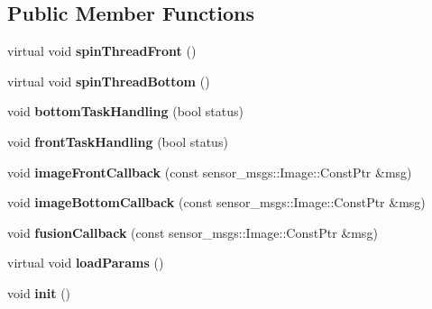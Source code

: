 \subsection*{Public Member Functions}
\begin{DoxyCompactItemize}
\item 
\mbox{\label{classBase__class_af6a0b08cc6b142bd06568953346a7510}} 
virtual void {\bfseries spin\+Thread\+Front} ()
\item 
\mbox{\label{classBase__class_a697ded45cee7fb2426458bb5b0105f00}} 
virtual void {\bfseries spin\+Thread\+Bottom} ()
\item 
\mbox{\label{classBase__class_a5bda5f5f5716cc83558677c60a2c4bc6}} 
void {\bfseries bottom\+Task\+Handling} (bool status)
\item 
\mbox{\label{classBase__class_abdfc7986221e6db12d267aa74736ca40}} 
void {\bfseries front\+Task\+Handling} (bool status)
\item 
\mbox{\label{classBase__class_a609e2b04688ea241e3dc2a6c1be25b21}} 
void {\bfseries image\+Front\+Callback} (const sensor\+\_\+msgs\+::\+Image\+::\+Const\+Ptr \&msg)
\item 
\mbox{\label{classBase__class_a3d9f198134835742ca0bc332ca52be3a}} 
void {\bfseries image\+Bottom\+Callback} (const sensor\+\_\+msgs\+::\+Image\+::\+Const\+Ptr \&msg)
\item 
\mbox{\label{classBase__class_ada15311e090a1017747a2040b47b8430}} 
void {\bfseries fusion\+Callback} (const sensor\+\_\+msgs\+::\+Image\+::\+Const\+Ptr \&msg)
\item 
\mbox{\label{classBase__class_a5c1d64c9bbbaa631396a2aea655df5a0}} 
virtual void {\bfseries load\+Params} ()
\item 
\mbox{\label{classBase__class_a5b23d53f25b7fc2fb20536b94a1e054e}} 
void {\bfseries init} ()
\end{DoxyCompactItemize}
